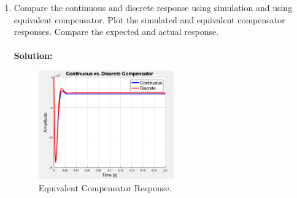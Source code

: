 \documentclass[11pt]{article}
\newcommand{\solution}{\textbf{Solution: \\}}
\begin{document}
\begin{enumerate}[label=\textbf{\arabic*.}]
  \vspace{24pt}
  \item Compare the continuous and discrete response using simulation and using 
  equivalent compensator. Plot the simulated and equivalent compensator responses. 
  Compare the expected and actual response. \\ \\ 
  \solution
  \begin{figure}[H]
    \centering
    \includegraphics[width=0.55\textwidth]{p6.png}
    \caption{Equivalent Compensator Response.}
  \end{figure}

\end{enumerate}
\end{document}
